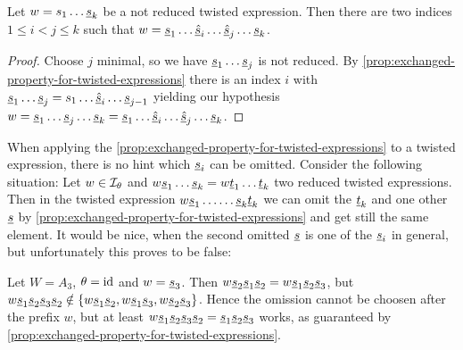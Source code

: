 \begin{prop}
	Let $w = s_1 \ldots \underline{s}_k$ be a not reduced twisted expression. Then there are two indices $1 \leq i < j \leq k$ such that $w = \underline{s}_1 \ldots \underline{\hat s}_i \ldots \underline{\hat s}_j \ldots \underline{s}_k$.

	\begin{proof}
		Choose $j$ minimal, so we have $\underline{s}_1 \ldots \underline{s}_j$ is not reduced. By \ref{prop:exchanged-property-for-twisted-expressions} there is an index $i$ with $\underline{s}_1 \ldots \underline{s}_j = s_1 \ldots \underline{\hat s}_i \ldots \underline{s}_{j-1}$ yielding our hypothesis $w = \underline{s}_1 \ldots \underline{s}_j \ldots \underline{s}_k = \underline{s}_1 \ldots \underline{\hat s}_i \ldots \underline{\hat s}_j \ldots \underline{s}_k$.
	\end{proof}
\end{prop}

When applying the \ref{prop:exchanged-property-for-twisted-expressions} to a twisted expression, there is no hint which $\underline{s}_i$ can be omitted. Consider the following situation: Let $w \in \mathcal{I}_{\theta}$ and $w \underline{s}_1 \ldots \underline{s}_k = w \underline{t}_1 \ldots \underline{t}_k$ two reduced twisted expressions. Then in the twisted expression $w \underline{s}_1 \ldots \ldots \underline{s}_k \underline{t}_k$ we can omit the $\underline{t}_k$ and one other $\underline{s}$ by \ref{prop:exchanged-property-for-twisted-expressions} and get still the same element. It would be nice, when the second omitted $\underline{s}$ is one of the $\underline{s}_i$ in general, but unfortunately this proves to be false:

\begin{exam}
	Let $W = A_3$, $\theta = \operatorname{id}$ and $w = \underline{s}_3$. Then $w \underline{s}_2 \underline{s}_1 \underline{s}_2 = w \underline{s}_1 \underline{s}_2 \underline{s}_3$, but $w \underline{s}_1 \underline{s}_2 \underline{s}_3 \underline{s}_2 \notin \{ w \underline{s}_1 \underline{s}_2, w \underline{s}_1 \underline{s}_3, w \underline{s}_2 \underline{s}_3 \}$. Hence the omission cannot be choosen after the prefix $w$, but at least $w \underline{s}_1 \underline{s}_2 \underline{s}_3 \underline{s}_2 = \underline{s}_1 \underline{s}_2 \underline{s}_3$ works, as guaranteed by \ref{prop:exchanged-property-for-twisted-expressions}.
\end{exam}